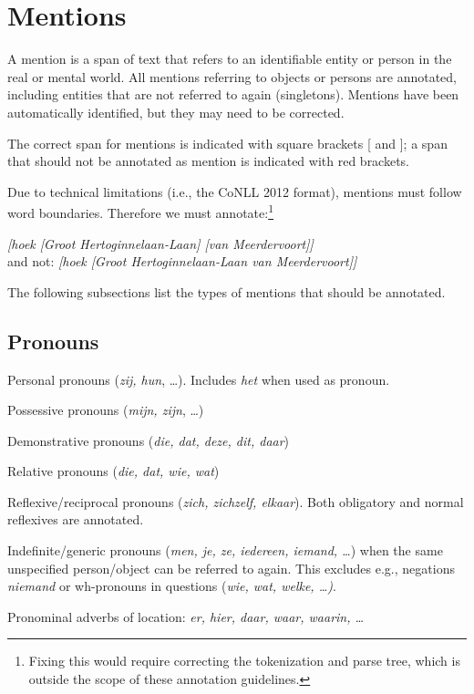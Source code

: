 \section{Mentions}

A mention is a span of text that refers to an identifiable
entity or person in the real or mental world.
All mentions referring to objects or persons are
annotated, including entities that are not referred to again
(singletons). Mentions have been automatically identified, but they may
need to be corrected.

The correct span for mentions is indicated with square brackets {[} and {]};
a span that should not be annotated as mention is indicated with \n{[} red brackets\n{]}.

Due to technical limitations (i.e., the CoNLL 2012 format),
mentions must follow word boundaries. Therefore we must annotate:\footnote{%
    Fixing this would require correcting the tokenization and parse tree,
    which is outside the scope of these annotation guidelines.}

\emph{[hoek [Groot Hertoginnelaan-Laan] [van Meerdervoort]]} \\
and not: \emph{[hoek [Groot Hertoginnelaan\n{]}-\n{[}Laan van Meerdervoort]]}

\noindent The following subsections list the types of mentions that should be annotated.

\subsection{Pronouns}
\begin{itemize*}
    \item Personal pronouns (\emph{zij, hun}, \dots).
        Includes \emph{het} when used as pronoun.
    \item Possessive pronouns (\emph{mijn, zijn}, \dots)
    \item Demonstrative pronouns (\emph{die, dat, deze, dit, daar})
    \item Relative pronouns (\emph{die, dat, wie, wat})
    \item Reflexive/reciprocal pronouns (\emph{zich, zichzelf, elkaar}).
        Both obligatory and normal reflexives are annotated.
    \item Indefinite/generic pronouns (\emph{men, je, ze, iedereen, iemand, \dots})
      when the same unspecified person/object can be referred to again.
      This excludes e.g., negations \emph{niemand}
      or wh-pronouns in questions (\emph{wie, wat, welke, \dots)}.
    \item Pronominal adverbs of location: \emph{er, hier, daar, waar, waarin, \dots}
\end{itemize*}

